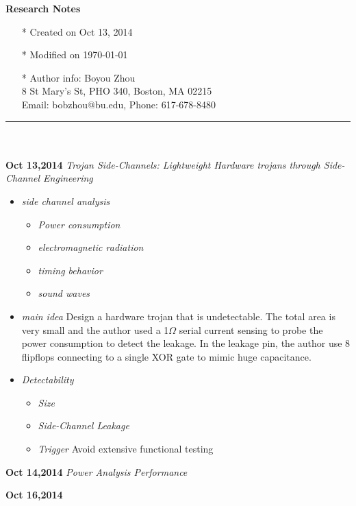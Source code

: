 \documentclass[]{article}
\begin{document}
\pagestyle{empty}
{\large\textbf{Research Notes}}
\begin{itemize}
    \item[*] Created on Oct 13, 2014
    \item[*] Modified on \today
    \item[*] Author info: Boyou Zhou\\
             8 St Mary's St, PHO 340, Boston, MA 02215\\
             Email: bobzhou@bu.edu, Phone: 617-678-8480
\end{itemize}


\rule[-0.1cm]{7.5in}{0.01cm}\\
\\
\noindent \textbf{Oct 13,2014}
\textit{Trojan Side-Channels: Lightweight Hardware trojans through Side-Channel Engineering}
\indent		\begin{itemize}

            \item \textit{side channel analysis} 
                \begin{itemize}
                    \item \textit{Power consumption}
                    \item \textit{electromagnetic radiation}
                    \item \textit{timing behavior}
                    \item \textit{sound waves}
                \end{itemize}
            \item \textit{main idea} Design a hardware trojan that is undetectable. The total area is very
                    small and the author used a 1$\Omega$ serial current sensing to probe the power consumption
                    to detect the leakage. In the leakage pin, the author use 8 flipflops connecting to a single
                    XOR gate to mimic huge capacitance.               
            
            \item \textit{Detectability} 
                \begin{itemize}
                    \item \textit{Size}
                    \item \textit{Side-Channel Leakage}
                    \item \textit{Trigger} Avoid extensive functional testing
                \end{itemize}

        \end{itemize}

\noindent \textbf{Oct 14,2014}
\textit{Power Analysis Performance}
\indent		\begin{itemize}
            \end{itemize}


\noindent \textbf{Oct 16,2014}
\textit{}
\indent		\begin{itemize}
            \end{itemize}
\end{document}
